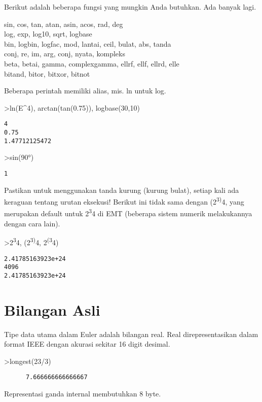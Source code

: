\documentclass[
]{book}
\begin{document}
Berikut adalah beberapa fungsi yang mungkin Anda butuhkan. Ada banyak lagi.

sin, cos, tan, atan, asin, acos, rad, deg\\
log, exp, log10, sqrt, logbase\\
bin, logbin, logfac, mod, lantai, ceil, bulat, abs, tanda\\
conj, re, im, arg, conj, nyata, kompleks\\
beta, betai, gamma, complexgamma, ellrf, ellf, ellrd, elle\\
bitand, bitor, bitxor, bitnot

Beberapa perintah memiliki alias, mis. ln untuk log.

\textgreater ln(E\^{}4), arctan(tan(0.75)), logbase(30,10)

\begin{verbatim}
4
0.75
1.47712125472
\end{verbatim}

\textgreater sin(90°)

\begin{verbatim}
1
\end{verbatim}

Pastikan untuk menggunakan tanda kurung (kurung bulat), setiap kali ada keraguan tentang urutan eksekusi! Berikut ini tidak sama dengan (2\textsuperscript{3)}4, yang merupakan default untuk 2\textsuperscript{3}4 di EMT (beberapa sistem numerik melakukannya dengan cara lain).

\textgreater2\textsuperscript{3}4, (2\textsuperscript{3)}4, 2\textsuperscript{(3}4)

\begin{verbatim}
2.41785163923e+24
4096
2.41785163923e+24
\end{verbatim}

\section{Bilangan Asli}\label{bilangan-asli}

Tipe data utama dalam Euler adalah bilangan real. Real direpresentasikan dalam format IEEE dengan akurasi sekitar 16 digit desimal.

\textgreater longest(23/3)

\begin{verbatim}
      7.666666666666667 
\end{verbatim}

Representasi ganda internal membutuhkan 8 byte.
\end{document}
